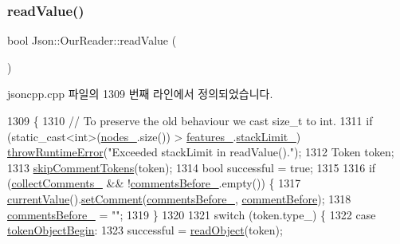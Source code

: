 \subsubsection{\texorpdfstring{read\+Value()}{readValue()}}
{\footnotesize\ttfamily bool Json\+::\+Our\+Reader\+::read\+Value (\begin{DoxyParamCaption}{ }\end{DoxyParamCaption})\hspace{0.3cm}{\ttfamily [private]}}



jsoncpp.\+cpp 파일의 1309 번째 라인에서 정의되었습니다.


\begin{DoxyCode}
1309                           \{
1310   \textcolor{comment}{//  To preserve the old behaviour we cast size\_t to int.}
1311   \textcolor{keywordflow}{if} (static\_cast<int>(\hyperlink{class_json_1_1_our_reader_a19cc4e8c5d17ee6822f752e9a36f4ce3}{nodes\_}.size()) > \hyperlink{class_json_1_1_our_reader_a2714302d5cc54ca2ce4118ea51c0397a}{features\_}.\hyperlink{class_json_1_1_our_features_a9a786713902d14be6d57a08cc03ccfff}{stackLimit\_}) 
      \hyperlink{namespace_json_a0ab7ff7f99788262d92d9ff3d924e065}{throwRuntimeError}(\textcolor{stringliteral}{"Exceeded stackLimit in readValue()."});
1312   Token token;
1313   \hyperlink{class_json_1_1_our_reader_a856dea44d92578c276856d7a65a4ebdc}{skipCommentTokens}(token);
1314   \textcolor{keywordtype}{bool} successful = \textcolor{keyword}{true};
1315 
1316   \textcolor{keywordflow}{if} (\hyperlink{class_json_1_1_our_reader_a259f6ac988da2894bcafc670e42f73ad}{collectComments\_} && !\hyperlink{class_json_1_1_our_reader_a9c53e77e290eb9081298210a955fda6a}{commentsBefore\_}.empty()) \{
1317     \hyperlink{class_json_1_1_our_reader_a2acd5b1d53e7d7e17c21ff8e96edc09d}{currentValue}().\hyperlink{class_json_1_1_value_a29f3a30f7e5d3af6f38d57999bf5b480}{setComment}(\hyperlink{class_json_1_1_our_reader_a9c53e77e290eb9081298210a955fda6a}{commentsBefore\_}, 
      \hyperlink{namespace_json_a4fc417c23905b2ae9e2c47d197a45351a52f1733775460517b2ea6bedf4906d52}{commentBefore});
1318     \hyperlink{class_json_1_1_our_reader_a9c53e77e290eb9081298210a955fda6a}{commentsBefore\_} = \textcolor{stringliteral}{""};
1319   \}
1320 
1321   \textcolor{keywordflow}{switch} (token.type\_) \{
1322   \textcolor{keywordflow}{case} \hyperlink{class_json_1_1_our_reader_a15116f7276ddf1e7a2cc3cbefa884dcca7495ef5c356d4faa39b702e528cc7e26}{tokenObjectBegin}:
1323     successful = \hyperlink{class_json_1_1_our_reader_aea198f8101dba55099f4d8121a993530}{readObject}(token);

\end{DoxyCode}
